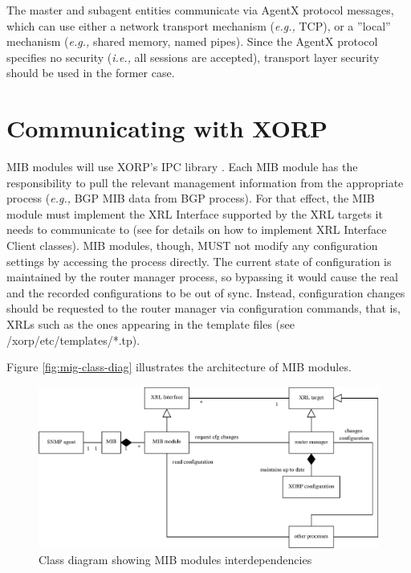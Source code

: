 \documentclass[11pt]{article}
\newcommand{\ie}{\emph{i.e.,}\xspace}
\newcommand{\eg}{\emph{e.g.,}\xspace}
\begin{document}
The master and subagent entities communicate via AgentX protocol messages, which
can use either a network transport mechanism (\eg TCP), or a ''local'' mechanism
(\eg shared memory, named pipes).  Since the AgentX protocol specifies no
security (\ie all sessions are accepted), transport layer security should be
used in the former case.


\section{Communicating with XORP}

MIB modules will use XORP's IPC library \cite{xorp:xrl}.  Each MIB module has the
responsibility to pull the relevant management information from the appropriate
process (\eg BGP MIB data from BGP process).  For that effect, the MIB module
must implement the XRL Interface supported by the XRL targets it needs to
communicate to (see \cite{xorp:xrl_interfaces} for details on how to implement
XRL Interface Client classes).  MIB modules, though, MUST not modify any
configuration settings by accessing the process directly.  The current state of
configuration is maintained by the router manager process, so bypassing it would
cause the real and the recorded configurations to be out of sync.  Instead,
configuration changes should be requested to the router manager via
configuration commands, that is, XRLs such as the ones appearing in the template
files (see /xorp/etc/templates/*.tp).

Figure \ref{fig:mig-class-diag} illustrates the architecture of MIB modules.
\begin{figure}
  \begin{center}
    \includegraphics[width=1\textwidth]{figs/snmp_fig1}
  \end{center}
  \caption{Class diagram showing MIB modules interdependencies}
  \label{fig:mib-class-diag}
\end{figure}
\end{document}
